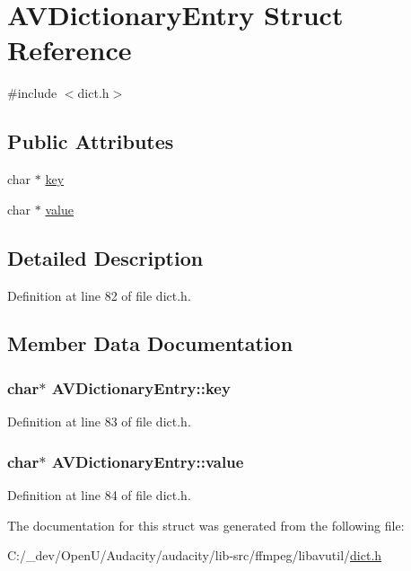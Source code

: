\hypertarget{struct_a_v_dictionary_entry}{}\section{A\+V\+Dictionary\+Entry Struct Reference}
\label{struct_a_v_dictionary_entry}


{\ttfamily \#include $<$dict.\+h$>$}

\subsection*{Public Attributes}
\begin{DoxyCompactItemize}
\item 
char $\ast$ \hyperlink{struct_a_v_dictionary_entry_a38fc80176f8f839282bb61c03392e194}{key}
\item 
char $\ast$ \hyperlink{struct_a_v_dictionary_entry_aa38678f2cad36f120d42e56449c5edb4}{value}
\end{DoxyCompactItemize}


\subsection{Detailed Description}


Definition at line 82 of file dict.\+h.



\subsection{Member Data Documentation}
\subsubsection[{\texorpdfstring{key}{key}}]{\setlength{\rightskip}{0pt plus 5cm}char$\ast$ A\+V\+Dictionary\+Entry\+::key}\hypertarget{struct_a_v_dictionary_entry_a38fc80176f8f839282bb61c03392e194}{}\label{struct_a_v_dictionary_entry_a38fc80176f8f839282bb61c03392e194}


Definition at line 83 of file dict.\+h.

\subsubsection[{\texorpdfstring{value}{value}}]{\setlength{\rightskip}{0pt plus 5cm}char$\ast$ A\+V\+Dictionary\+Entry\+::value}\hypertarget{struct_a_v_dictionary_entry_aa38678f2cad36f120d42e56449c5edb4}{}\label{struct_a_v_dictionary_entry_aa38678f2cad36f120d42e56449c5edb4}


Definition at line 84 of file dict.\+h.



The documentation for this struct was generated from the following file\+:\begin{DoxyCompactItemize}
\item 
C\+:/\+\_\+dev/\+Open\+U/\+Audacity/audacity/lib-\/src/ffmpeg/libavutil/\hyperlink{dict_8h}{dict.\+h}\end{DoxyCompactItemize}
